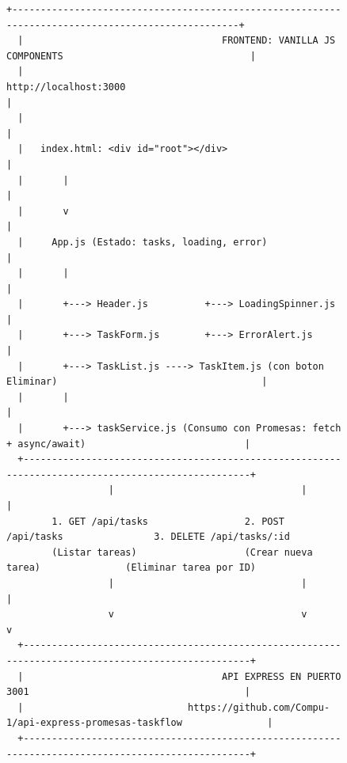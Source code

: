 \documentclass[10pt,letterpaper]{article}
\begin{document}
\begin{figure}[h!]
\centering
\begin{lstlisting}[style=bashstyle]
  +---------------------------------------------------------------------------------------------------+
  |                                   FRONTEND: VANILLA JS COMPONENTS                                 |
  |                                       http://localhost:3000                                       |
  |                                                                                                   |
  |   index.html: <div id="root"></div>                                                               |
  |       |                                                                                           |
  |       v                                                                                           |
  |     App.js (Estado: tasks, loading, error)                                                        |
  |       |                                                                                           |
  |       +---> Header.js          +---> LoadingSpinner.js                                            |
  |       +---> TaskForm.js        +---> ErrorAlert.js                                                |
  |       +---> TaskList.js ----> TaskItem.js (con boton Eliminar)                                    |
  |       |                                                                                           |
  |       +---> taskService.js (Consumo con Promesas: fetch + async/await)                            |
  +---------------------------------------------------------------------------------------------------+
                  |                                 |                                 |
        1. GET /api/tasks                 2. POST /api/tasks                3. DELETE /api/tasks/:id
        (Listar tareas)                   (Crear nueva tarea)               (Eliminar tarea por ID)
                  |                                 |                                 |
                  v                                 v                                 v
  +---------------------------------------------------------------------------------------------------+
  |                                   API EXPRESS EN PUERTO 3001                                      |
  |                             https://github.com/Compu-1/api-express-promesas-taskflow               |
  +---------------------------------------------------------------------------------------------------+
\end{lstlisting}
\end{figure}
\end{document}
